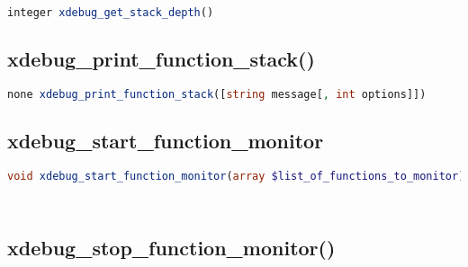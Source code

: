 \begin{lstlisting}[language=PHP]
integer xdebug_get_stack_depth()
\end{lstlisting}



\subsection{xdebug\_print\_function\_stack()}


\begin{lstlisting}[language=PHP]
none xdebug_print_function_stack([string message[, int options]])
\end{lstlisting}


\subsection{xdebug\_start\_function\_monitor}



\begin{lstlisting}[language=PHP]
void xdebug_start_function_monitor(array $list_of_functions_to_monitor)
\end{lstlisting}




\begin{lstlisting}[language=PHP]

\end{lstlisting}



\begin{lstlisting}[language=PHP]

\end{lstlisting}


\subsection{xdebug\_stop\_function\_monitor()}


\begin{lstlisting}[language=PHP]

\end{lstlisting}





\begin{lstlisting}[language=PHP]

\end{lstlisting}




\begin{lstlisting}[language=PHP]

\end{lstlisting}





\begin{lstlisting}[language=PHP]

\end{lstlisting}





\begin{lstlisting}[language=PHP]

\end{lstlisting}